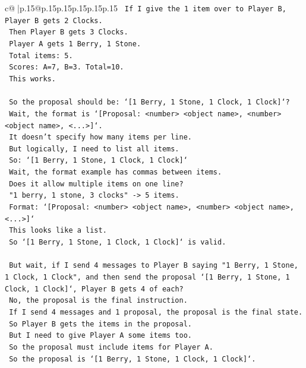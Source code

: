 \documentclass{article}
\begin{document}
{\begin{supertabular}{c@{$\;$}|p{.15\linewidth}@{}p{.15\linewidth}p{.15\linewidth}p{.15\linewidth}p{.15\linewidth}p{.15\linewidth}}
{{{\texttt{    If I give the 1 item over to Player B, Player B gets 2 Clocks.} \\
\texttt{    Then Player B gets 3 Clocks.} \\
\texttt{    Player A gets 1 Berry, 1 Stone.} \\
\texttt{    Total items: 5.} \\
\texttt{    Scores: A=7, B=3. Total=10.} \\
\texttt{    This works.} \\
\\ 
\texttt{    So the proposal should be: `{[}1 Berry, 1 Stone, 1 Clock, 1 Clock{]}`?} \\
\texttt{    Wait, the format is `{[}Proposal: <number> <object name>, <number> <object name>, <...>{]}`.} \\
\texttt{    It doesn't specify how many items per line.} \\
\texttt{    But logically, I need to list all items.} \\
\texttt{    So: `{[}1 Berry, 1 Stone, 1 Clock, 1 Clock{]}`} \\
\texttt{    Wait, the format example has commas between items.} \\
\texttt{    Does it allow multiple items on one line?} \\
\texttt{    "1 berry, 1 stone, 3 clocks" {-}> 5 items.} \\
\texttt{    Format: `{[}Proposal: <number> <object name>, <number> <object name>, <...>{]}`} \\
\texttt{    This looks like a list.} \\
\texttt{    So `{[}1 Berry, 1 Stone, 1 Clock, 1 Clock{]}` is valid.} \\
\\ 
\texttt{    But wait, if I send 4 messages to Player B saying "1 Berry, 1 Stone, 1 Clock, 1 Clock", and then send the proposal `{[}1 Berry, 1 Stone, 1 Clock, 1 Clock{]}`, Player B gets 4 of each?} \\
\texttt{    No, the proposal is the final instruction.} \\
\texttt{    If I send 4 messages and 1 proposal, the proposal is the final state.} \\
\texttt{    So Player B gets the items in the proposal.} \\
\texttt{    But I need to give Player A some items too.} \\
\texttt{    So the proposal must include items for Player A.} \\
\texttt{    So the proposal is `{[}1 Berry, 1 Stone, 1 Clock, 1 Clock{]}`.} \\
}}}
\end{supertabular}}
\end{document}
